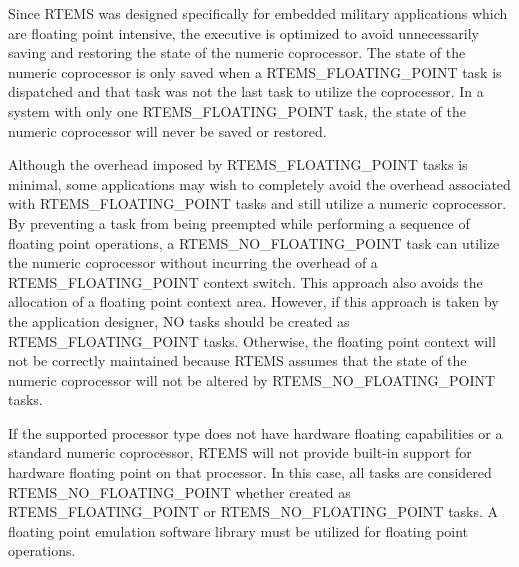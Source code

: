 Since R\+T\+E\+MS was designed specifically for embedded military applications which are floating point intensive, the executive is optimized to avoid unnecessarily saving and restoring the state of the numeric coprocessor. The state of the numeric coprocessor is only saved when a {\ttfamily R\+T\+E\+M\+S\+\_\+\+F\+L\+O\+A\+T\+I\+N\+G\+\_\+\+P\+O\+I\+NT} task is dispatched and that task was not the last task to utilize the coprocessor. In a system with only one {\ttfamily R\+T\+E\+M\+S\+\_\+\+F\+L\+O\+A\+T\+I\+N\+G\+\_\+\+P\+O\+I\+NT} task, the state of the numeric coprocessor will never be saved or restored.

Although the overhead imposed by {\ttfamily R\+T\+E\+M\+S\+\_\+\+F\+L\+O\+A\+T\+I\+N\+G\+\_\+\+P\+O\+I\+NT} tasks is minimal, some applications may wish to completely avoid the overhead associated with {\ttfamily R\+T\+E\+M\+S\+\_\+\+F\+L\+O\+A\+T\+I\+N\+G\+\_\+\+P\+O\+I\+NT} tasks and still utilize a numeric coprocessor. By preventing a task from being preempted while performing a sequence of floating point operations, a {\ttfamily R\+T\+E\+M\+S\+\_\+\+N\+O\+\_\+\+F\+L\+O\+A\+T\+I\+N\+G\+\_\+\+P\+O\+I\+NT} task can utilize the numeric coprocessor without incurring the overhead of a {\ttfamily R\+T\+E\+M\+S\+\_\+\+F\+L\+O\+A\+T\+I\+N\+G\+\_\+\+P\+O\+I\+NT} context switch. This approach also avoids the allocation of a floating point context area. However, if this approach is taken by the application designer, NO tasks should be created as {\ttfamily R\+T\+E\+M\+S\+\_\+\+F\+L\+O\+A\+T\+I\+N\+G\+\_\+\+P\+O\+I\+NT} tasks. Otherwise, the floating point context will not be correctly maintained because R\+T\+E\+MS assumes that the state of the numeric coprocessor will not be altered by {\ttfamily R\+T\+E\+M\+S\+\_\+\+N\+O\+\_\+\+F\+L\+O\+A\+T\+I\+N\+G\+\_\+\+P\+O\+I\+NT} tasks.

If the supported processor type does not have hardware floating capabilities or a standard numeric coprocessor, R\+T\+E\+MS will not provide built-\/in support for hardware floating point on that processor. In this case, all tasks are considered {\ttfamily R\+T\+E\+M\+S\+\_\+\+N\+O\+\_\+\+F\+L\+O\+A\+T\+I\+N\+G\+\_\+\+P\+O\+I\+NT} whether created as {\ttfamily R\+T\+E\+M\+S\+\_\+\+F\+L\+O\+A\+T\+I\+N\+G\+\_\+\+P\+O\+I\+NT} or {\ttfamily R\+T\+E\+M\+S\+\_\+\+N\+O\+\_\+\+F\+L\+O\+A\+T\+I\+N\+G\+\_\+\+P\+O\+I\+NT} tasks. A floating point emulation software library must be utilized for floating point operations.

